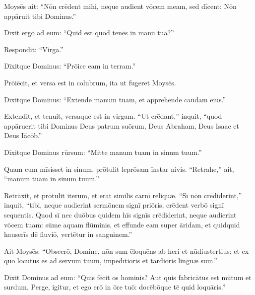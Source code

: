 
\thispagestyle{empty}

\vspace*{-1.0cm}

 Moysēs ait: ``Nōn crēdent mihi, neque audient vōcem meam, sed dīcent:
Nōn appāruit tibi Dominus.''

Dīxit ergō ad eum: ``Quid est quod tenēs in manū tuā?''

Respondit: ``Virga.''

Dīxitque Dominus: ``Prōice eam in terram.''

Prōiēcit, et versa est in colubrum, ita ut fugeret Moysēs. 

Dīxitque Dominus: ``Extende manum tuam, et apprehende caudam eius.''

Extendit, et tenuit, versaque est in virgam.
``Ut crēdant,'' inquit, ``quod appāruerit tibi Dominus Deus patrum suōrum,
Deus Abraham, Deus Isaac et Deus Iācōb.''

Dīxitque Dominus rūrsum: ``Mitte manum tuam in sinum tuum.''

Quam cum mīsisset in sinum, prōtulit leprōsam īnstar nivis.
``Retrahe,'' ait, ``manum tuam in sinum tuum.''

Retrāxit, et prōtulit iterum,
et erat similis carnī reliquæ.
``Sī nōn crēdiderint,'' inquit, ``tibi, neque audierint
sermōnem signī priōris, crēdent verbō signī sequentis. 
Quod sī nec duōbus quidem hīs signīs crēdiderint,
neque audierint vōcem tuam: sūme aquam flūminis,
et effunde eam super āridam, et quidquid hauserīs dē fluviō,
vertētur in sanguinem.''


Ait Moysēs: ``Obsecrō, Domine, nōn sum ēloquēns ab heri et
nūdiustertius: et ex quō locūtus es ad servum tuum,
impedītiōris et tardiōris linguæ sum.''

Dīxit Dominus ad eum: ``Quis fēcit os hominis?
Aut quis fabricātus est mūtum et surdum,
Perge, igitur, et ego erō in ōre tuō:
docēbōque tē quid loquāris.''

